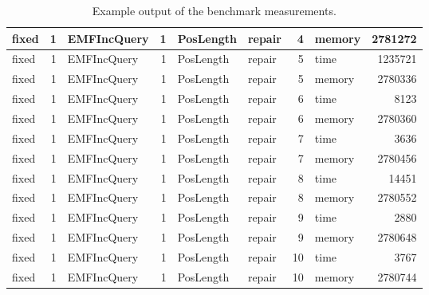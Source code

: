\documentclass[submission,copyright,creativecommons]{eptcs}
\begin{document}
\begin{table}
\begin{tabular}{| l | r | l | r | l | l | r | l | r |}
fixed & 1 & EMFIncQuery & 1 & PosLength & repair & 4 & memory & 2781272\\\hline
fixed & 1 & EMFIncQuery & 1 & PosLength & repair & 5 & time & 1235721\\\hline
fixed & 1 & EMFIncQuery & 1 & PosLength & repair & 5 & memory & 2780336\\\hline
fixed & 1 & EMFIncQuery & 1 & PosLength & repair & 6 & time & 8123\\\hline
fixed & 1 & EMFIncQuery & 1 & PosLength & repair & 6 & memory & 2780360\\\hline
fixed & 1 & EMFIncQuery & 1 & PosLength & repair & 7 & time & 3636\\\hline
fixed & 1 & EMFIncQuery & 1 & PosLength & repair & 7 & memory & 2780456\\\hline
fixed & 1 & EMFIncQuery & 1 & PosLength & repair & 8 & time & 14451\\\hline
fixed & 1 & EMFIncQuery & 1 & PosLength & repair & 8 & memory & 2780552\\\hline
fixed & 1 & EMFIncQuery & 1 & PosLength & repair & 9 & time & 2880\\\hline
fixed & 1 & EMFIncQuery & 1 & PosLength & repair & 9 & memory & 2780648\\\hline
fixed & 1 & EMFIncQuery & 1 & PosLength & repair & 10 & time & 3767\\\hline
fixed & 1 & EMFIncQuery & 1 & PosLength & repair & 10 & memory & 2780744\\\hline
\end{tabular}
\caption{Example output of the benchmark measurements.}
\label{tab:exampleoutput}
\end{table}
\end{document}
